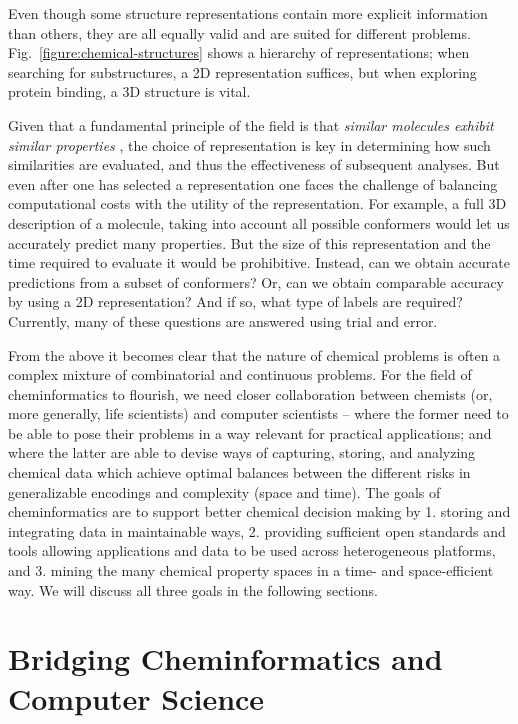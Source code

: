 \documentclass{sig-alternate}
\begin{document}
Even though some structure representations contain more explicit
information than others, they are all equally valid and are suited for
different problems. Fig.~\ref{figure:chemical-structures} shows
a hierarchy of representations; when searching for
substructures, a 2D representation suffices, but when exploring
protein binding, a 3D structure is vital.

Given that a fundamental principle of the field is that \emph{similar
molecules exhibit similar properties} \cite{Johnson:1990qf}, the
choice of representation is key in determining how such similarities
are evaluated, and thus the effectiveness of subsequent analyses. But
even after one has selected a representation one faces the challenge
of balancing computational costs with the utility of the
representation. For example, a full 3D description of a molecule,
taking into account all possible conformers would let us accurately
predict many properties. But the size of this representation and the
time required to evaluate it would be prohibitive. Instead, can we
obtain accurate predictions from a subset of conformers? Or, can we
obtain comparable accuracy by using a 2D representation? And if so,
what type of labels are required? Currently, many of these questions
are answered using trial and error.

From the above it becomes clear that the nature of chemical problems
is often a complex mixture of combinatorial and continuous problems.
For the field of cheminformatics to flourish, we need closer
collaboration between chemists (or, more generally, life scientists)
and computer scientists -- where the former need to be able to pose
their problems in a way relevant for practical applications; and where
the latter are able to devise ways of capturing, storing, and
analyzing chemical data which achieve optimal balances between the
different risks in generalizable encodings and complexity (space and
time). The goals of cheminformatics are to support better chemical
decision making by 1. storing and integrating data in maintainable
ways, 2.  providing sufficient open standards and tools allowing
applications and data to be used across heterogeneous platforms, and
3. mining the many chemical property spaces in a time- and
space-efficient way. We will discuss all three goals in the following
sections.

\section{Bridging Cheminformatics and Computer Science}
\end{document}
